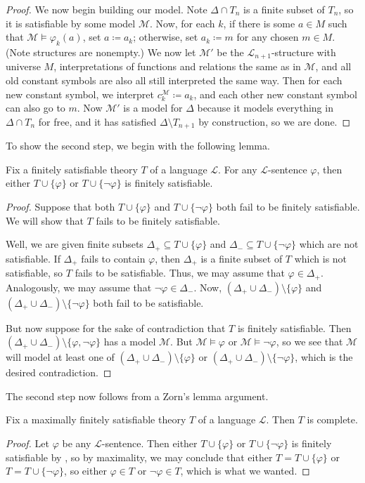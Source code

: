 \documentclass[../notes.tex]{subfiles}
\begin{document}
\begin{proof}
	We now begin building our model. Note $\Delta\cap T_n$ is a finite subset of $T_n$, so it is satisfiable by some model $\mathcal M$. Now, for each $k$, if there is some $a\in M$ such that $\mathcal M\models\varphi_k(a)$, set $a\coloneqq a_k$; otherwise, set $a_k\coloneqq m$ for any chosen $m\in M$. (Note structures are nonempty.) We now let $\mathcal M'$ be the $\mathcal L_{n+1}$-structure with universe $M$, interpretations of functions and relations the same as in $\mathcal M$, and all old constant symbols are also all still interpreted the same way. Then for each new constant symbol, we interpret $c_k^\mathcal M\coloneqq a_k$, and each other new constant symbol can also go to $m$. Now $\mathcal M'$ is a model for $\Delta$ because it models everything in $\Delta\cap T_n$ for free, and it has satisfied $\Delta\setminus T_{n+1}$ by construction, so we are done.
\end{proof}
To show the second step, we begin with the following lemma.
\begin{lemma} \label{lem:fs-can-extend-complete}
	Fix a finitely satisfiable theory $T$ of a language $\mathcal L$. For any $\mathcal L$-sentence $\varphi$, then either $T\cup\{\varphi\}$ or $T\cup\{\lnot\varphi\}$ is finitely satisfiable.
\end{lemma}
\begin{proof}
	Suppose that both $T\cup\{\varphi\}$ and $T\cup\{\lnot\varphi\}$ both fail to be finitely satisfiable. We will show that $T$ fails to be finitely satisfiable.

	Well, we are given finite subsets $\Delta_+\subseteq T\cup\{\varphi\}$ and $\Delta_-\subseteq T\cup\{\lnot\varphi\}$ which are not satisfiable. If $\Delta_+$ fails to contain $\varphi$, then $\Delta_+$ is a finite subset of $T$ which is not satisfiable, so $T$ fails to be satisfiable. Thus, we may assume that $\varphi\in\Delta_+$. Analogously, we may assume that $\lnot\varphi\in\Delta_-$. Now, $(\Delta_+\cup\Delta_-)\setminus\{\varphi\}$ and $(\Delta_+\cup\Delta_-)\setminus\{\lnot\varphi\}$ both fail to be satisfiable.

	But now suppose for the sake of contradiction that $T$ is finitely satisfiable. Then $(\Delta_+\cup\Delta_-)\setminus\{\varphi,\lnot\varphi\}$ has a model $\mathcal M$. But $\mathcal M\models\varphi$ or $\mathcal M\models\lnot\varphi$, so we see that $\mathcal M$ will model at least one of $(\Delta_+\cup\Delta_-)\setminus\{\varphi\}$ or $(\Delta_+\cup\Delta_-)\setminus\{\lnot\varphi\}$, which is the desired contradiction.
\end{proof}
The second step now follows from a Zorn's lemma argument.
\begin{lemma}
	Fix a maximally finitely satisfiable theory $T$ of a language $\mathcal L$. Then $T$ is complete.
\end{lemma}
\begin{proof}
	Let $\varphi$ be any $\mathcal L$-sentence. Then either $T\cup\{\varphi\}$ or $T\cup\{\lnot\varphi\}$ is finitely satisfiable by , so by maximality, we may conclude that either $T=T\cup\{\varphi\}$ or $T=T\cup\{\lnot\varphi\}$, so either $\varphi\in T$ or $\lnot\varphi\in T$, which is what we wanted.
\end{proof}
\end{document}
